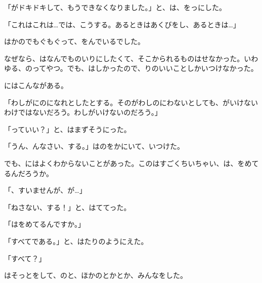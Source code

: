 「がドキドキして、もうできなくなりました。」と、は、をっにした。

「これはこれは…では、こうする。あるときはあくびをし、あるときは…」

はかのでもぐもぐって、をんでいるでした。

なぜなら、はなんでものいりにしたくて、そこかられるものはせなかった。いわゆる、のってやつ。でも、はしかったので、りのいいことしかいつけなかった。

にはこんながある。

「わしがにのになれとしたとする。そのがわしのにわないとしても、がいけないわけではないだろう。わしがいけないのだろう。」

「っていい？」と、はまずそうにった。

「うん、んなさい、する。」はのをかにいて、いつけた。

でも、にはよくわからないことがあった。このはすごくちいちゃい、は、をめてるんだろうか。

「、すいませんが、が…」

「ねさない、する！」と、はててった。

「はをめてるんですか。」

「すべてである。」と、はたりのようにえた。

「すべて？」

はそっとをして、のと、ほかのとかとか、みんなをした。

